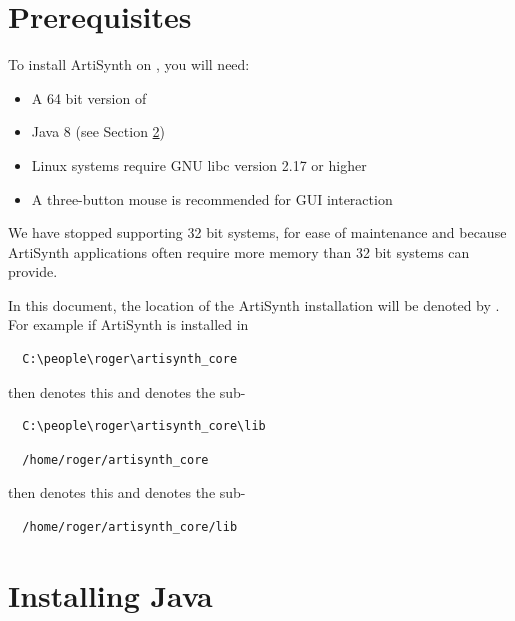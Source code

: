\section{Prerequisites}

To install ArtiSynth on \SYSTEM{}, you will need:

\begin{itemize}

\item A 64 bit version of \SYSTEM{}

\item Java 8 (see Section \ref{InstallingJava})

\ifLinux
\item Linux systems require GNU libc version 2.17 or higher
\fi

\item A three-button mouse is recommended for GUI interaction

\end{itemize}

\begin{sideblock}
We have stopped supporting 32 bit systems, for ease of maintenance and
because ArtiSynth applications often require more memory than 32 bit
systems can provide.
\end{sideblock}

In this document, the location of the ArtiSynth installation \directory{}
will be denoted by \ArtHome[]. For example
if ArtiSynth is installed in
\ifWindows
\begin{verbatim}
  C:\people\roger\artisynth_core
\end{verbatim}
then \ArtHome[] denotes this \directory{}
and  denotes the sub-\directory{}
\begin{verbatim}
  C:\people\roger\artisynth_core\lib
\end{verbatim}
\else %
\begin{verbatim}
  /home/roger/artisynth_core
\end{verbatim}
then \ArtHome[] denotes this \directory{}
and  denotes the sub-\directory{}
\begin{verbatim}
  /home/roger/artisynth_core/lib
\end{verbatim}
\fi %

\section{Installing Java}
\label{InstallingJava}

